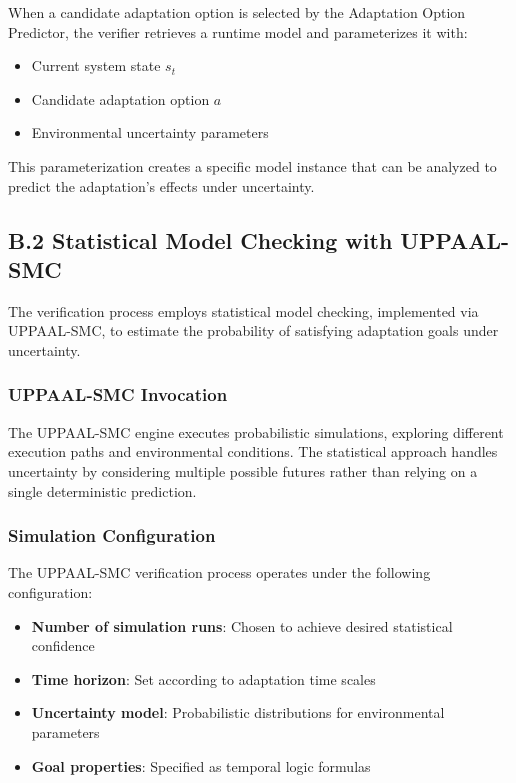 \documentclass[11pt,a4paper]{article}
\begin{document}
When a candidate adaptation option is selected by the Adaptation Option Predictor, the verifier retrieves a runtime model and parameterizes it with:

\begin{itemize}
    \item Current system state $s_t$
    \item Candidate adaptation option $a$
    \item Environmental uncertainty parameters
\end{itemize}

This parameterization creates a specific model instance that can be analyzed to predict the adaptation's effects under uncertainty.


\subsection{B.2 Statistical Model Checking with UPPAAL-SMC}
\label{app:uppaal-smc}

The verification process employs statistical model checking, implemented via UPPAAL-SMC, to estimate the probability of satisfying adaptation goals under uncertainty.

\subsubsection{UPPAAL-SMC Invocation}

The UPPAAL-SMC engine executes probabilistic simulations, exploring different execution paths and environmental conditions. The statistical approach handles uncertainty by considering multiple possible futures rather than relying on a single deterministic prediction.

\subsubsection{Simulation Configuration}

The UPPAAL-SMC verification process operates under the following configuration:

\begin{itemize}
    \item \textbf{Number of simulation runs}: Chosen to achieve desired statistical confidence
    \item \textbf{Time horizon}: Set according to adaptation time scales
    \item \textbf{Uncertainty model}: Probabilistic distributions for environmental parameters
    \item \textbf{Goal properties}: Specified as temporal logic formulas
\end{itemize}
\end{document}
